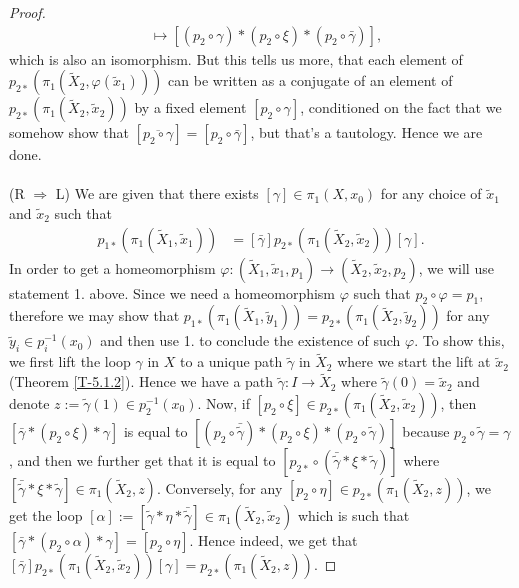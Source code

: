 \documentclass[letterpaper,11pt,twoside]{article}
\theoremstyle{definition}
\theoremstyle{definition}
\theoremstyle{definition}
\theoremstyle{definition}
\theoremstyle{definition}
\theoremstyle{definition}
\theoremstyle{remark}
\theoremstyle{definition}
\begin{document}
\begin{proof}
\begin{align*}
			[p_2\circ \xi] &\longmapsto [(p_2\circ \gamma) *(p_2\circ \xi)*(p_2\circ \bar{\gamma})],
	\end{align*}
	which is also an isomorphism. But this tells us more, that each element of $  p_{2*}(\pi_1(\tilde{X}_2,\varphi(\tilde{x}_1))) $ can be written as a conjugate of an element of $  p_{2*} (\pi_1(\tilde{X}_2,\tilde{x}_2)) $ by a fixed element $ [p_2\circ \gamma] $, conditioned on the fact that we somehow show that $ [\overline{p_2\circ \gamma}] = [p_2\circ \bar{\gamma}]$, but that's a tautology. Hence we are done.\\\\
	(R $ \Rightarrow $ L) We are given that there exists $ [\gamma] \in \pi_1(X,x_0) $ for any choice of $ \tilde{x}_1 $ and $ \tilde{x}_2 $ such that 
	\begin{align*}
		p_{1*}(\pi_1(\tilde{X}_1,\tilde{x}_1)) &= [\bar{\gamma}] p_{2*}(\pi_1(\tilde{X}_2,\tilde{x}_2))  [\gamma].
	\end{align*}
	In order to get a homeomorphism $ \varphi : (\tilde{X}_1,\tilde{x}_1,p_1) \to  (\tilde{X}_2,\tilde{x}_2,p_2)$, we will use statement 1. above. Since we need a homeomorphism $ \varphi $ such that $ p_2\circ \varphi = p_1 $, therefore we may show that $ p_{1*}(\pi_1(\tilde{X}_1,\tilde{y}_1)) = p_{2*}(\pi_1(\tilde{X}_2,\tilde{y}_2))$ for any $ \tilde{y}_i\in p_i^{-1}(x_0) $ and then use 1. to conclude the existence of such $ \varphi $. To show this, we first lift the loop $ \gamma $ in $ X $ to a unique path $ \tilde{\gamma} $ in $ \tilde{X}_2 $ where we start the lift at $ \tilde{x}_2 $ (Theorem \ref{T-5.1.2}). Hence we have a path $ \tilde{\gamma} : I\to \tilde{X}_2$ where $ \tilde{\gamma}(0) = \tilde{x}_2 $ and denote $ z:=\tilde{\gamma}(1) \in p_2^{-1}(x_0)$. Now, if $ [p_2\circ \xi] \in p_{2*}(\pi_1(\tilde{X}_2,\tilde{x}_2)) $, then $ [\bar{\gamma}*(p_2\circ \xi) * \gamma] $ is equal to $ [(p_2\circ \bar{\tilde{\gamma}}) * (p_2\circ \xi ) * (p_2\circ \tilde{\gamma})] $ because $ p_2\circ \tilde{\gamma} = \gamma $, and then we further get that it is equal to $ [p_{2*}\circ (\bar{\tilde{\gamma}} * \xi * \tilde{\gamma})] $ where $ [\bar{\tilde{\gamma}} * \xi * \tilde{\gamma}] \in \pi_1(\tilde{X}_2,z)$. Conversely, for any $ [p_2\circ\eta] \in p_{2*}(\pi_1(\tilde{X}_2,z)) $, we get the loop $ [\alpha] := [\tilde{\gamma}*\eta *\bar{\tilde{\gamma}}] \in \pi_1(\tilde{X}_2,\tilde{x}_2) $ which is such that $ [\bar{\gamma} * (p_2\circ \alpha) * \gamma] = [p_2\circ \eta] $. Hence indeed, we get that $  [\bar{\gamma}] p_{2*}(\pi_1(\tilde{X}_2,\tilde{x}_2))  [\gamma] = p_{2*}(\pi_1(\tilde{X}_2,z)) $.

\end{proof}
\end{document}
